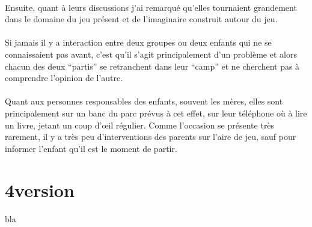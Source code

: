 \paragraph{} Ensuite, quant à leurs discussions j'ai remarqué qu'elles
tournaient grandement dans le domaine du jeu présent et de l'imaginaire
construit autour du jeu.

\paragraph{} Si jamais il y a interaction entre deux groupes ou deux enfants
qui ne se connaissaient pas avant, c'est qu'il s'agit principalement d'un
problème et alors chacun des deux ``partis'' se retranchent dans leur ``camp''
et ne cherchent pas à comprendre l'opinion de l'autre.

\paragraph{} Quant aux personnes responsables des enfants, souvent les
mères, elles sont principalement sur un banc du parc prévus à cet effet, sur
leur téléphone où à lire un livre, jetant un coup d'œil régulier. Comme
l'occasion se présente très rarement, il y a très peu d'interventions des
parents sur l'aire de jeu, sauf pour informer l'enfant qu'il est le moment de
partir.

\section{4\ieme version}

\paragraph{}
bla

